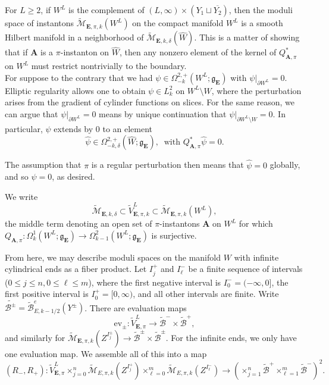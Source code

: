 \documentclass{memo-l}
\theoremstyle{definition}
\theoremstyle{remark}
\numberwithin{section}{chapter}
\numberwithin{equation}{chapter}
\begin{document}
For $L \geq 2$, if $W^L$ is the complement of $(L,\infty) \times (Y_1 \sqcup \overline{Y_2})$, then the moduli space of instantons $\widetilde{\mathcal M}_{\mathbf{E},\pi,k}(W^L)$ on the compact manifold $W^L$ is a smooth Hilbert manifold in a neighborhood of $\widetilde{\mathcal M}_{\mathbf{E},k,\delta}(\hat W)$. This is a matter of showing that if $\mathbf{A}$ is a $\pi$-instanton on $\hat W$, then any nonzero element of the kernel of $Q^*_{\mathbf{A},\pi}$ on $W^L$ must restrict nontrivially to the boundary.\\

For suppose to the contrary that we had $\psi \in \Omega^{2,+}_{-k}(W^L;\mathfrak g_{\mathbf{E}})$ with $\psi|_{\partial W^L} = 0$. Elliptic regularity allows one to obtain $\psi \in L^2_k$ on $W^L \setminus W$, where the perturbation arises from the gradient of cylinder functions on slices. For the same reason, we can argue that $\psi|_{\partial W^L} = 0$ means by unique continuation that $\psi|_{\partial W^L \setminus W} = 0$. In particular, $\psi$ extends by $0$ to an element 
$$\hat \psi \in \Omega^{2,+}_{-k,\delta}(\hat W;\mathfrak g_{\mathbf{E}}), \;\; \text{with } Q^*_{\mathbf{A},\pi}\hat \psi = 0.$$

The assumption that $\pi$ is a regular perturbation then means that $\hat \psi = 0$ globally, and so $\psi = 0$, as desired. 

We write 
$$\widetilde{\mathcal M}_{\mathbf{E},k,\delta} \subset \widetilde V^L_{\mathbf{E},\pi,k} \subset \widetilde{\mathcal M}_{\mathbf{E},\pi,k}(W^L),$$
the middle term denoting an open set of $\pi$-instantons $\mathbf{A}$ on $W^L$ for which $Q_{\mathbf{A},\pi}: \Omega^1_k(W^L;\mathfrak g_{\mathbf{E}}) \to \Omega^2_{k-1}(W^L;\mathfrak g_{\mathbf{E}})$ is surjective. 

From here, we may describe moduli spaces on the manifold $W$ with infinite cylindrical ends as a fiber product. Let $I^+_j$ and $I^-_\ell$ be a finite sequence of intervals ($0 \leq j \leq n, 0 \leq \ell \leq m$), where the first negative interval is $I^-_0 = (-\infty, 0]$, the first positive interval is $I^+_0 = [0,\infty)$, and all other intervals are finite. Write $\widetilde{\mathcal B^\pm} = \widetilde{\mathcal B}^e_{E,k-1/2}(Y^\pm)$. There are evaluation maps $$\text{ev}_\pm: \widetilde{V}^L_{\mathbf{E},\pi} \to \widetilde{\mathcal B}^- \times \widetilde{\mathcal B}^+,$$ and similarly for $\widetilde{\mathcal M}_{\mathbf{E},\pi,k}(Z^{I^\pm_j}) \to \widetilde{\mathcal B}^\pm \times \widetilde{\mathcal B}^\pm$. For the infinite ends, we only have one evaluation map. We assemble all of this into a map $$(R_-, R_+): \widetilde{V}^L_{\mathbf{E},\pi} \times_{j=0}^n \widetilde{\mathcal M}_{E,\pi,k}(Z^{I^+_j}) \times_{\ell=0}^m \widetilde{\mathcal M}_{E,\pi,k}(Z^{I^-_{\ell}}) \to \left(\times_{j=1}^n\widetilde{\mathcal B}^+ \times_{\ell=1}^m \widetilde{\mathcal B}^-\right)^2.$$
\end{document}
